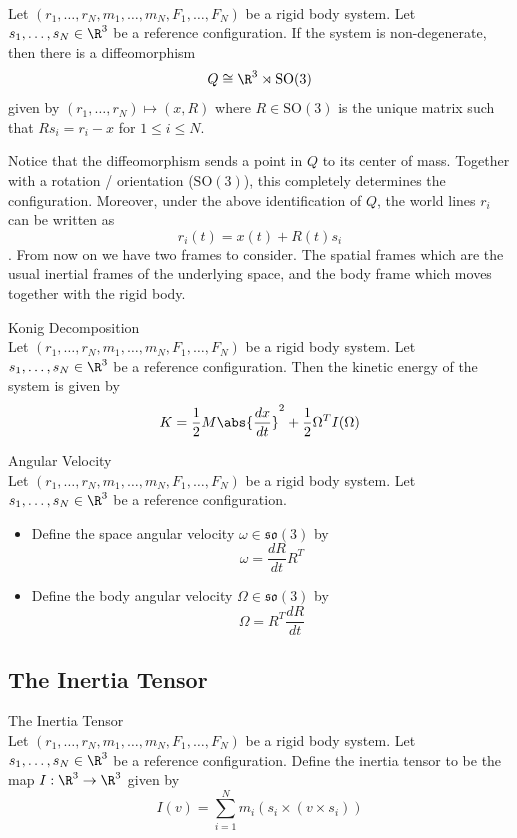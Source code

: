 \documentclass[a4paper]{article}
\begin{document}
\begin{prp}{}{}\\
Let $(r_1,\dots,r_N,m_1,\dots,m_N,F_1,\dots,F_N)$ be a rigid body system. Let $s_1,\dots,s_N\in\R^3$ be a reference configuration. If the system is non-degenerate, then there is a diffeomorphism $$Q\cong\R^3\rtimes\text{SO}(3)$$ given by $(r_1,\dots,r_N)\mapsto(x,R)$ where $R\in\text{SO}(3)$ is the unique matrix such that $Rs_i=r_i-x$ for $1\leq i\leq N$. 
\end{prp}

Notice that the diffeomorphism sends a point in $Q$ to its center of mass. Together with a rotation / orientation ($\text{SO}(3)$), this completely determines the configuration. Moreover, under the above identification of $Q$, the world lines $r_i$ can be written as $$r_i(t)=x(t)+R(t)s_i$$. From now on we have two frames to consider. The spatial frames which are the usual inertial frames of the underlying space, and the body frame which moves together with the rigid body. 

\begin{thm}{Konig Decomposition}{}\\
Let $(r_1,\dots,r_N,m_1,\dots,m_N,F_1,\dots,F_N)$ be a rigid body system. Let $s_1,\dots,s_N\in\R^3$ be a reference configuration. Then the kinetic energy of the system is given by $$K=\frac{1}{2}M\abs{\frac{dx}{dt}}^2+\frac{1}{2}\Omega^TI(\Omega)$$
\end{thm}

\begin{defn}{Angular Velocity}{}\\
Let $(r_1,\dots,r_N,m_1,\dots,m_N,F_1,\dots,F_N)$ be a rigid body system. Let $s_1,\dots,s_N\in\R^3$ be a reference configuration. 
\begin{itemize}
\item Define the space angular velocity $\omega\in\mathfrak{so}(3)$ by $$\omega=\frac{dR}{dt}R^T$$
\item Define the body angular velocity $\Omega\in\mathfrak{so}(3)$ by $$\Omega=R^T\frac{dR}{dt}$$
\end{itemize}
\end{defn}

\subsection{The Inertia Tensor}
\begin{defn}{The Inertia Tensor}{}\\
Let $(r_1,\dots,r_N,m_1,\dots,m_N,F_1,\dots,F_N)$ be a rigid body system. Let $s_1,\dots,s_N\in\R^3$ be a reference configuration. Define the inertia tensor to be the map $I:\R^3\to\R^3$ given by $$I(v)=\sum_{i=1}^Nm_i\left(s_i\times(v\times s_i)\right)$$
\end{defn}
\end{document}
